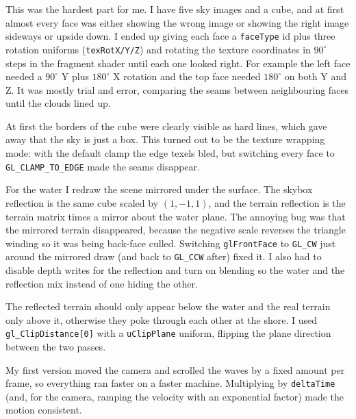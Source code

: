 \documentclass[11pt]{article}
\begin{document}
\begin{description}[leftmargin=0pt,style=nextline]
\item[Putting the right image on the right cube face]
This was the hardest part for me. I have five sky images and a cube, and at first almost
every face was either showing the wrong image or showing the right image sideways or
upside down. I ended up giving each face a \texttt{faceType} id plus three rotation
uniforms (\texttt{texRotX/Y/Z}) and rotating the texture coordinates in $90^{\circ}$ steps
in the fragment shader until each one looked right. For example the left face needed a
$90^{\circ}$ Y plus $180^{\circ}$ X rotation and the top face needed $180^{\circ}$ on both
Y and Z. It was mostly trial and error, comparing the seams between neighbouring faces
until the clouds lined up.

\item[Hiding the edges of the box]
At first the borders of the cube were clearly visible as hard lines, which gave away that
the sky is just a box. This turned out to be the texture wrapping mode: with the default
clamp the edge texels bled, but switching every face to \texttt{GL\_CLAMP\_TO\_EDGE} made
the seams disappear.

\item[Flipping the box for the reflection]
For the water I redraw the scene mirrored under the surface. The skybox reflection is the
same cube scaled by $(1,-1,1)$, and the terrain reflection is the terrain matrix times a
mirror about the water plane. The annoying bug was that the mirrored terrain disappeared,
because the negative scale reverses the triangle winding so it was being back-face culled.
Switching \texttt{glFrontFace} to \texttt{GL\_CW} just around the mirrored draw (and back
to \texttt{GL\_CCW} after) fixed it. I also had to disable depth writes for the reflection
and turn on blending so the water and the reflection mix instead of one hiding the other.

\item[Cutting the terrain at the water line]
The reflected terrain should only appear below the water and the real terrain only above
it, otherwise they poke through each other at the shore. I used \texttt{gl\_ClipDistance[0]}
with a \texttt{uClipPlane} uniform, flipping the plane direction between the two passes.

\item[Making speed frame-rate independent]
My first version moved the camera and scrolled the waves by a fixed amount per frame, so
everything ran faster on a faster machine. Multiplying by \texttt{deltaTime} (and, for the
camera, ramping the velocity with an exponential factor) made the motion consistent.
\end{description}
\end{document}
